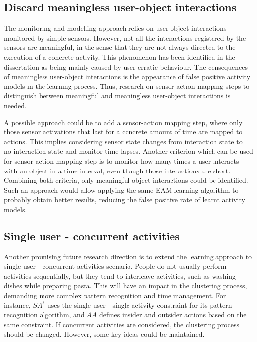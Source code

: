 \subsection{Discard meaningless user-object interactions}

The monitoring and modelling approach relies on user-object interactions monitored by simple sensors. However, not all the interactions registered by the sensors are meaningful, in the sense that they are not always directed to the execution of a concrete activity. This phenomenon has been identified in the dissertation as being mainly caused by user erratic behaviour. The consequences of meaningless user-object interactions is the appearance of false positive activity models in the learning process. Thus, research on sensor-action mapping steps to distinguish between meaningful and meaningless user-object interactions is needed.

A possible approach could be to add a sensor-action mapping step, where only those sensor activations that last for a concrete amount of time are mapped to actions. This implies considering sensor state changes from interaction state to no-interaction state and monitor time lapses. Another criterion which can be used for sensor-action mapping step is to monitor how many times a user interacts with an object in a time interval, even though those interactions are short. Combining both criteria, only meaningful object interactions could be identified. Such an approach would allow applying the same EAM learning algorithm to probably obtain better results, reducing the false positive rate of learnt activity models.

\subsection{Single user - concurrent activities}

Another promising future research direction is to extend the learning approach to single user - concurrent activities scenario. People do not usually perform activities sequentially, but they tend to interleave activities, such as washing dishes while preparing pasta. This will have an impact in the clustering process, demanding more complex pattern recognition and time management. For instance, $SA^3$ uses the single user - single activity constraint for its pattern recognition algorithm, and $AA$ defines insider and outsider actions based on the same constraint. If concurrent activities are considered, the clustering process should be changed. However, some key ideas could be maintained. 

